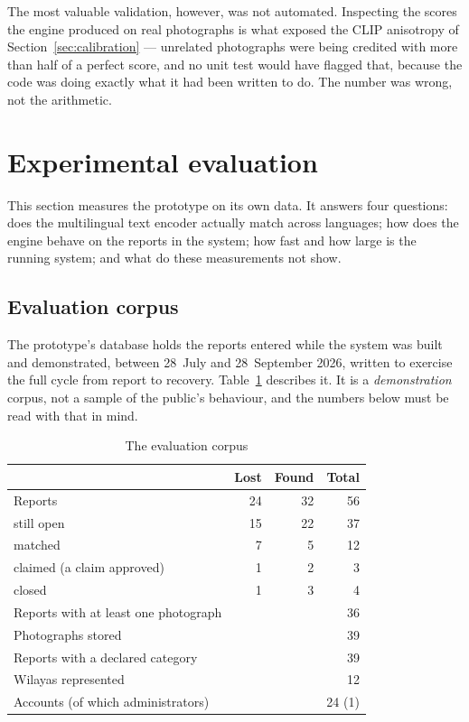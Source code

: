 The most valuable validation, however, was not automated. Inspecting the scores
the engine produced on real photographs is what exposed the CLIP anisotropy of
Section~\ref{sec:calibration} --- unrelated photographs were being credited with
more than half of a perfect score, and no unit test would have flagged that,
because the code was doing exactly what it had been written to do. The number
was wrong, not the arithmetic.

\section{Experimental evaluation}
\label{sec:evaluation}

This section measures the prototype on its own data. It answers four questions:
does the multilingual text encoder actually match across languages; how does
the engine behave on the reports in the system; how fast and how large is the
running system; and what do these measurements not show.

\subsection{Evaluation corpus}

The prototype's database holds the reports entered while the system was built
and demonstrated, between 28~July and 28~September 2026, written to exercise the
full cycle from report to recovery. Table~\ref{tab:corpus} describes it. It is a \emph{demonstration} corpus,
not a sample of the public's behaviour, and the numbers below must be read with
that in mind.

\begin{table}[htbp]
\centering
\caption{The evaluation corpus}
\label{tab:corpus}
\small
\begin{tabularx}{\textwidth}{@{}X r r r@{}}
\toprule
 & \textbf{Lost} & \textbf{Found} & \textbf{Total} \\
\midrule
Reports                                   & 24 & 32 & 56 \\
\quad still open                          & 15 & 22 & 37 \\
\quad matched                            & 7  & 5  & 12 \\
\quad claimed (a claim approved)          & 1  & 2  & 3  \\
\quad closed                              & 1  & 3  & 4  \\
Reports with at least one photograph      & \multicolumn{2}{r}{} & 36 \\
Photographs stored                        & \multicolumn{2}{r}{} & 39 \\
Reports with a declared category          & \multicolumn{2}{r}{} & 39 \\
Wilayas represented                       & \multicolumn{2}{r}{} & 12 \\
Accounts (of which administrators)        & \multicolumn{2}{r}{} & 24 (1) \\
\bottomrule
\end{tabularx}
\end{table}

